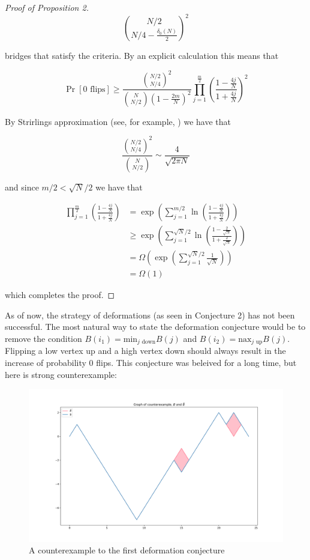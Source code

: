 \documentclass{article}
\theoremstyle{definition}
\begin{document}
\begin{proof}[Proof of Proposition 2]
$${N/2 \choose N/4-\frac{\delta_0(N)}{2}}^2$$

bridges that satisfy the criteria. By an explicit calculation this means that

\begin{equation*}
\Pr[0\,\,\mathrm{flips}]\geq \frac{{N/2 \choose N/4}^2}{{N \choose N/2}\left(1-\frac{2m}{N}\right)^{2}} \prod_{j=1}^{\frac{m}{2}}\left(\frac{1-\frac{4j}{N}}{1+\frac{4j}{N}}\right)^{2}
\end{equation*}

By Strirlings approximation (see, for example, \cite{eger2014stirling}) we have that

$$\frac{{N/2 \choose N/4}^2}{{N \choose N/2}}\sim \frac{4}{\sqrt{2\pi N}}$$

and since $m/2<\sqrt{N}/2$ we have that

\begin{align*}
\prod_{j=1}^{\frac{m}{2}}\left(\frac{1-\frac{4j}{N}}{1+\frac{4j}{N}}\right)&=\exp\left(\sum_{j=1}^{m/2}\ln\left(\frac{1-\frac{4j}{N}}{1+\frac{4j}{N}}\right)\right)\\
&\geq \exp\left(\sum_{j=1}^{\sqrt{N}/2}\ln\left(\frac{1-\frac{2}{\sqrt{N}}}{1+\frac{2}{\sqrt{N}}}\right)\right)\\
&=\Omega\left( \exp\left(\sum_{j=1}^{\sqrt{N}/2}\frac{1}{\sqrt{N}}\right)\right)\\
&=\Omega(1)
\end{align*}


which completes the proof.
\end{proof}

As of now, the strategy of deformations (as seen in Conjecture 2) has not been successful. The most natural way to state the deformation conjecture would be to remove the condition $B(i_1)=\mathrm{min}_{j\,\,\mathrm{down}}B(j)$ and $B(i_2)=\mathrm{nax}_{j\,\,\mathrm{up}}B(j)$. Flipping a low vertex up and a high vertex down should always result in the increase of probability 0 flips. This conjecture was beleived for a long time, but here is strong counterexample:

\begin{figure}[h!]
\caption{A counterexample to the first deformation conjecture}
\centering
\includegraphics[width=\textwidth]{Figure_9}
\end{figure}
\end{document}
